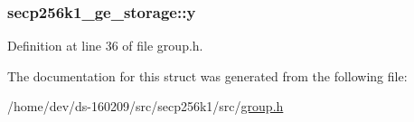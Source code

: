 \hypertarget{structsecp256k1__ge__storage_af0b13f3e06135a94484cc6f6dd4ef3cc}{}
\subsubsection[{y}]{ secp256k1\+\_\+ge\+\_\+storage\+::y}\label{structsecp256k1__ge__storage_af0b13f3e06135a94484cc6f6dd4ef3cc}


Definition at line 36 of file group.\+h.



The documentation for this struct was generated from the following file\+:\begin{DoxyCompactItemize}
\item 
/home/dev/ds-\/160209/src/secp256k1/src/\hyperlink{group_8h}{group.\+h}\end{DoxyCompactItemize}
